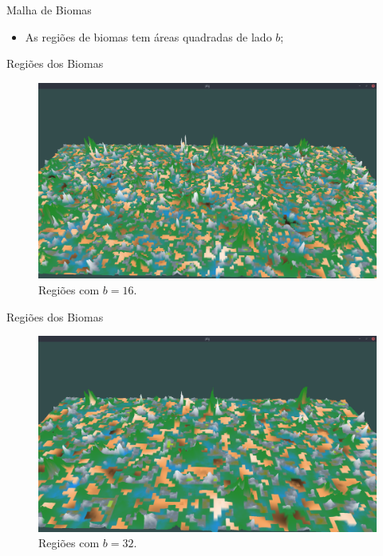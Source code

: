 \begin{frame}{Malha de Biomas}
    \begin{itemize} \setlength\itemsep{1em}
        \item As regiões de biomas tem áreas quadradas de lado $b$;
    \end{itemize}
\end{frame}

\begin{frame}{Regiões dos Biomas}
    \begin{figure}[H]
        \centering
        \includegraphics[width=.9\textwidth]{img/re2bfb/b/16f4.png}
        \caption{Regiões com $b = 16$.}
        \label{fig:img_re2bfb_b_16f4}
    \end{figure}
    
    
\end{frame}

\begin{frame}{Regiões dos Biomas}
    \begin{figure}[H]
        \centering
        \includegraphics[width=.9\textwidth]{img/re2bfb/b/32f4.png}
        \caption{Regiões com $b = 32$.}
        \label{fig:img_re2bfb_b_32f4}
    \end{figure}
    
    
\end{frame}

